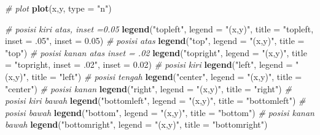\documentclass[]{book}
\newenvironment{Shaded}{\begin{snugshade}}{\end{snugshade}}
\newcommand{\KeywordTok}[1]{\textcolor[rgb]{0.13,0.29,0.53}{\textbf{#1}}}
\newcommand{\DataTypeTok}[1]{\textcolor[rgb]{0.13,0.29,0.53}{#1}}
\newcommand{\FloatTok}[1]{\textcolor[rgb]{0.00,0.00,0.81}{#1}}
\newcommand{\StringTok}[1]{\textcolor[rgb]{0.31,0.60,0.02}{#1}}
\newcommand{\CommentTok}[1]{\textcolor[rgb]{0.56,0.35,0.01}{\textit{#1}}}
\newcommand{\NormalTok}[1]{#1}
\begin{document}
\begin{Shaded}
\begin{Highlighting}[]
\CommentTok{# plot}
\KeywordTok{plot}\NormalTok{(x,y, }\DataTypeTok{type =} \StringTok{"n"}\NormalTok{)}

\CommentTok{# posisi kiri atas, inset =0.05}
\KeywordTok{legend}\NormalTok{(}\StringTok{"topleft"}\NormalTok{,}
  \DataTypeTok{legend =} \StringTok{"(x,y)"}\NormalTok{,}
  \DataTypeTok{title =} \StringTok{"topleft, inset = .05"}\NormalTok{,}
  \DataTypeTok{inset =} \FloatTok{0.05}\NormalTok{)}
\CommentTok{# posisi atas}
\KeywordTok{legend}\NormalTok{(}\StringTok{"top"}\NormalTok{,}
       \DataTypeTok{legend =} \StringTok{"(x,y)"}\NormalTok{,}
       \DataTypeTok{title =} \StringTok{"top"}\NormalTok{)}
\CommentTok{# posisi kanan atas inset = .02}
\KeywordTok{legend}\NormalTok{(}\StringTok{"topright"}\NormalTok{,}
       \DataTypeTok{legend =} \StringTok{"(x,y)"}\NormalTok{,}
       \DataTypeTok{title =} \StringTok{"topright, inset = .02"}\NormalTok{,}
       \DataTypeTok{inset =} \FloatTok{0.02}\NormalTok{)}
\CommentTok{# posisi kiri}
\KeywordTok{legend}\NormalTok{(}\StringTok{"left"}\NormalTok{,}
       \DataTypeTok{legend =} \StringTok{"(x,y)"}\NormalTok{,}
       \DataTypeTok{title =} \StringTok{"left"}\NormalTok{)}
\CommentTok{# posisi tengah}
\KeywordTok{legend}\NormalTok{(}\StringTok{"center"}\NormalTok{,}
       \DataTypeTok{legend =} \StringTok{"(x,y)"}\NormalTok{,}
       \DataTypeTok{title =} \StringTok{"center"}\NormalTok{)}
\CommentTok{# posisi kanan}
\KeywordTok{legend}\NormalTok{(}\StringTok{"right"}\NormalTok{,}
       \DataTypeTok{legend =} \StringTok{"(x,y)"}\NormalTok{,}
       \DataTypeTok{title =} \StringTok{"right"}\NormalTok{)}
\CommentTok{# posisi kiri bawah}
\KeywordTok{legend}\NormalTok{(}\StringTok{"bottomleft"}\NormalTok{,}
       \DataTypeTok{legend =} \StringTok{"(x,y)"}\NormalTok{,}
       \DataTypeTok{title =} \StringTok{"bottomleft"}\NormalTok{)}
\CommentTok{# posisi bawah}
\KeywordTok{legend}\NormalTok{(}\StringTok{"bottom"}\NormalTok{,}
       \DataTypeTok{legend =} \StringTok{"(x,y)"}\NormalTok{,}
       \DataTypeTok{title =} \StringTok{"bottom"}\NormalTok{)}
\CommentTok{# posisi kanan bawah}
\KeywordTok{legend}\NormalTok{(}\StringTok{"bottomright"}\NormalTok{,}
       \DataTypeTok{legend =} \StringTok{"(x,y)"}\NormalTok{,}
       \DataTypeTok{title =} \StringTok{"bottomright"}\NormalTok{)}
\end{Highlighting}
\end{Shaded}
\end{document}
